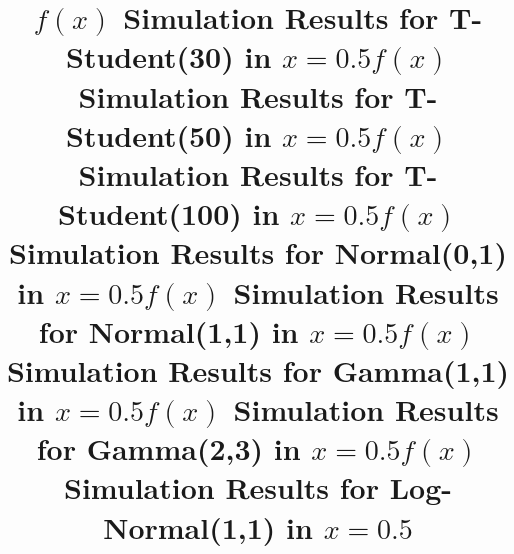 \documentclass{article}
\begin{document}
{\begin{table}[H]
  \centering
  \title{$f(x)$ Simulation Results for T-Student(30) in $x = 0.5$}
  
  \label{tab:simulation_t_student_30_x5}
\end{table}

\begin{table}[H]
  \centering
  \title{$f(x)$ Simulation Results for T-Student(50) in $x = 0.5$}
  
  \label{tab:simulation_t_student_50_x5}
\end{table}

\begin{table}[H]
  \centering
  \title{$f(x)$ Simulation Results for T-Student(100) in $x = 0.5$}
  
  \label{tab:simulation_t_student_100_x5}
\end{table}

\begin{table}[H]
  \centering
  \title{$f(x)$ Simulation Results for Normal(0,1) in $x = 0.5$}
  
  \label{tab:simulation_normal_0_1_x5}
\end{table}

\begin{table}[H]
  \centering
  \title{$f(x)$ Simulation Results for Normal(1,1) in $x = 0.5$}
  
  \label{tab:simulation_normal_1_1_x5}
\end{table}

\begin{table}[H]
  \centering
  \title{$f(x)$ Simulation Results for Gamma(1,1) in $x = 0.5$}
  
  \label{tab:simulation_gamma_1_1_x5}
\end{table}

\begin{table}[H]
  \centering
  \title{$f(x)$ Simulation Results for Gamma(2,3) in $x = 0.5$}
  
  \label{tab:simulation_gamma_2_3_x5}
\end{table}

\begin{table}[H]
  \centering
  \title{$f(x)$ Simulation Results for Log-Normal(1,1) in $x = 0.5$}
  
  \label{tab:simulation_log_normal_1_1_x5}
\end{table}
}
\end{document}
